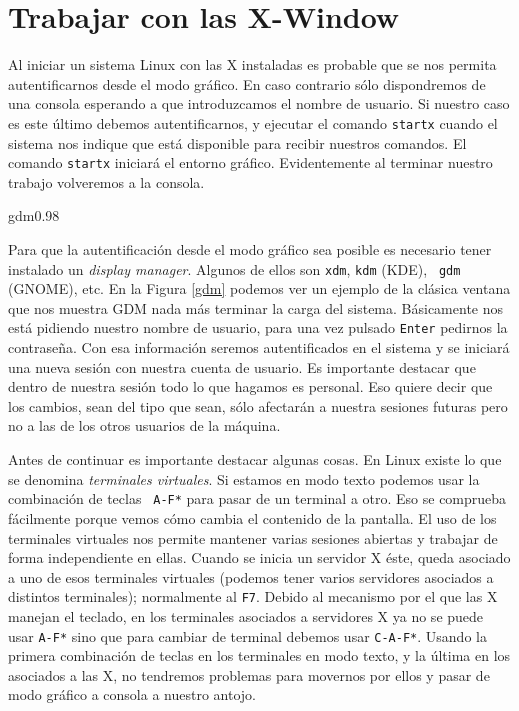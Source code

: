\section{Trabajar con las X-Window}

Al iniciar  un sistema Linux  con las  {\sf X} instaladas  es probable
que  se  nos  permita  autentificarnos   desde  el  modo  gráfico.  En
caso  contrario  sólo dispondremos  de  una  consola esperando  a  que
introduzcamos el  nombre de  usuario. Si nuestro  caso es  este último
debemos  autentificarnos, y  ejecutar el  comando {\tt  startx} cuando
el  sistema nos  indique  que está  disponible  para recibir  nuestros
comandos.  El  comando  {\tt  startx}  iniciará  el  entorno  gráfico.
Evidentemente al terminar nuestro trabajo volveremos a la consola.

\begin{figura}{gdm}{0.98}
\caption{Ventana de autentificación de GDM}\label{gdm}
\end{figura}

Para  que la  autentificación desde  el  modo gráfico  sea posible  es
necesario  tener  instalado  un  {\em  display  manager}.    Algunos   de    ellos    son   {\tt    xdm}, {\tt  kdm} ({\sf  KDE}), {\tt
gdm}  ({\sf  GNOME}), etc.  En  la  Figura
\ref{gdm} podemos ver un ejemplo de la clásica ventana que nos muestra
{\sf GDM} nada más terminar la carga del sistema. Básicamente nos está
pidiendo nuestro nombre  de usuario, para una vez  pulsado {\tt Enter}
pedirnos la contraseña. Con  esa información seremos autentificados en
el  sistema y  se  iniciará una  nueva sesión  con  nuestra cuenta  de
usuario. Es importante  destacar que dentro de nuestra  sesión todo lo
que hagamos  es personal. Eso quiere  decir que los cambios,  sean del
tipo que sean, sólo afectarán a nuestra sesiones futuras pero no a las
de los otros usuarios de la máquina.

Antes  de continuar  es importante  destacar algunas  cosas. En  Linux
existe lo que se  denomina {\em terminales virtuales}.
Si estamos  en modo texto podemos  usar la combinación de  teclas {\tt
A-F*} para  pasar de un terminal  a otro. Eso se  comprueba fácilmente
porque vemos  cómo cambia el contenido  de la pantalla. El  uso de los
terminales virtuales  nos permite mantener varias  sesiones abiertas y
trabajar de forma independiente en ellas. Cuando se inicia un servidor
{\sf  X} éste,  queda  asociado  a uno  de  esos terminales  virtuales
(podemos tener  varios servidores  asociados a  distintos terminales);
normalmente al  {\tt F7}. Debido al  mecanismo por el que  las {\sf X}
manejan el teclado,  en los terminales asociados a  servidores {\sf X}
ya  no se  puede usar  {\tt A-F*}  sino que  para cambiar  de terminal
debemos usar {\tt C-A-F*}. Usando  la primera combinación de teclas en
los terminales en modo texto, y la  última en los asociados a las {\sf
X}, no  tendremos problemas para  movernos por  ellos y pasar  de modo
gráfico a consola a nuestro antojo.

